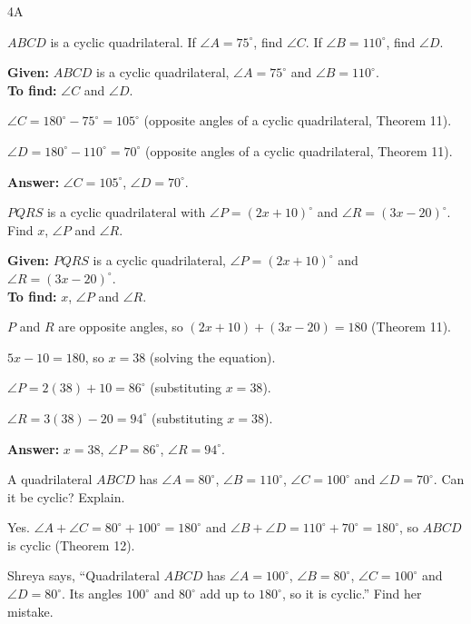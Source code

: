 \begin{exercise}{4A}
\item $ABCD$ is a cyclic quadrilateral. If $\angle A=75^\circ$, find $\angle C$. If $\angle B=110^\circ$, find $\angle D$.
\begin{solution}
\textbf{Given:} $ABCD$ is a cyclic quadrilateral, $\angle A=75^\circ$ and $\angle B=110^\circ$.\\
\textbf{To find:} $\angle C$ and $\angle D$.
\begin{steps}
  \item $\angle C=180^\circ-75^\circ=105^\circ$ (opposite angles of a cyclic quadrilateral, Theorem 11).
  \item $\angle D=180^\circ-110^\circ=70^\circ$ (opposite angles of a cyclic quadrilateral, Theorem 11).
\end{steps}
\textbf{Answer:} $\angle C=105^\circ$, $\angle D=70^\circ$.
\end{solution}
\item $PQRS$ is a cyclic quadrilateral with $\angle P=(2x+10)^\circ$ and $\angle R=(3x-20)^\circ$. Find $x$, $\angle P$ and $\angle R$.
\begin{solution}
\textbf{Given:} $PQRS$ is a cyclic quadrilateral, $\angle P=(2x+10)^\circ$ and $\angle R=(3x-20)^\circ$.\\
\textbf{To find:} $x$, $\angle P$ and $\angle R$.
\begin{steps}
  \item $P$ and $R$ are opposite angles, so $(2x+10)+(3x-20)=180$ (Theorem 11).
  \item $5x-10=180$, so $x=38$ (solving the equation).
  \item $\angle P=2(38)+10=86^\circ$ (substituting $x=38$).
  \item $\angle R=3(38)-20=94^\circ$ (substituting $x=38$).
\end{steps}
\textbf{Answer:} $x=38$, $\angle P=86^\circ$, $\angle R=94^\circ$.
\end{solution}
\item A quadrilateral $ABCD$ has $\angle A=80^\circ$, $\angle B=110^\circ$, $\angle C=100^\circ$ and $\angle D=70^\circ$. Can it be cyclic? Explain.
\begin{solution}
Yes. $\angle A+\angle C=80^\circ+100^\circ=180^\circ$ and $\angle B+\angle D=110^\circ+70^\circ=180^\circ$, so $ABCD$ is cyclic (Theorem 12).
\end{solution}
\item Shreya says, ``Quadrilateral $ABCD$ has $\angle A=100^\circ$, $\angle B=80^\circ$, $\angle C=100^\circ$ and $\angle D=80^\circ$. Its angles $100^\circ$ and $80^\circ$ add up to $180^\circ$, so it is cyclic.'' Find her mistake.

\end{exercise}

